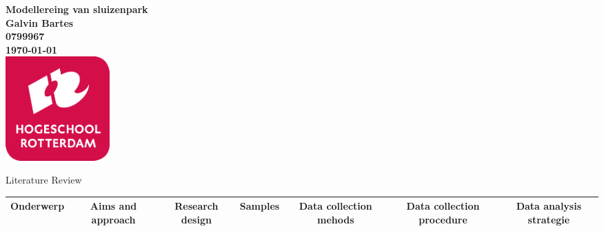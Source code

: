\documentclass{article}
\begin{document}
\sffamily
\begin{titlepage}
  \centering
    \vfill
    {\bfseries\Huge
      Modellereing van sluizenpark \\
        \vskip2cm
      }
      {\bfseries\Large
        Galvin Bartes\\
      }
      {
        \bfseries\normalsize
        0799967\\
        \vskip1cm
        \today\\
    }    
    \vfill
    \includegraphics[width=4cm]{logohr.png} %
    \vfill
    \vfill
\end{titlepage}
\newpage
\tableofcontents













\begin{frame}[shrink=40]{Literature Review}
	\begin{table}[htbp]
		\centering
		\begin{tabular}{|c|c|c|c|c|c|c|}\hline
			Onderwerp&\multicolumn{1}{m{1cm}|}{Aims and approach}&\multicolumn{1}{m{2cm}|}{Research design}&\multicolumn{1}{m{1cm}|}{Samples}&\multicolumn{1}{m{2cm}|}{Data collection mehods}&\multicolumn{1}{m{2cm}|}{Data collection procedure}&\multicolumn{1}{m{2cm}|}{Data analysis strategie} \\\hline
			
			
			
			
		\end{tabular}
	\end{table}
	
\end{frame}






\end{document}
